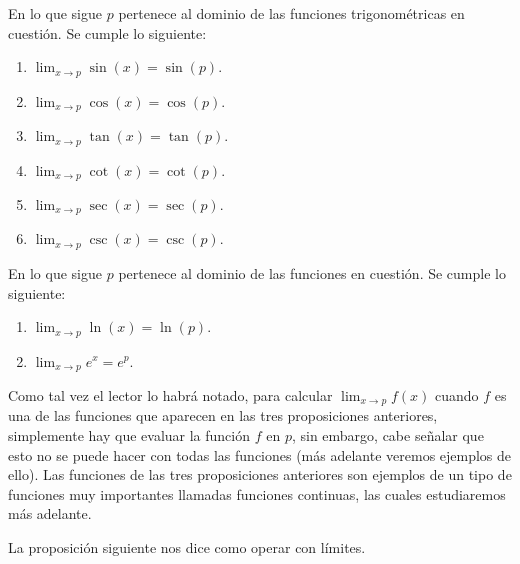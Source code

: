\documentclass[12pt,a4paper]{book}
\begin{document}
    \begin{proposicion}\label{prop:34}
        En lo
        que sigue $p$ pertenece al dominio de las funciones trigonométricas en cuestión.
        Se cumple lo siguiente:
        \begin{enumerate}[nosep]
            \item $\displaystyle\lim_{x\to p}\sin(x)=\sin(p)$.
            \item $\displaystyle\lim_{x\to p}\cos(x)=\cos(p)$.
            \item $\displaystyle\lim_{x\to p}\tan(x)=\tan(p)$.
            \item $\displaystyle\lim_{x\to p}\cot(x)=\cot(p)$.
            \item $\displaystyle\lim_{x\to p}\sec(x)=\sec(p)$.
            \item $\displaystyle\lim_{x\to p}\csc(x)=\csc(p)$.
        \end{enumerate}
    \end{proposicion}

    \begin{proposicion}\label{prop:35}
        En lo que sigue $p$ pertenece al dominio de las funciones en cuestión.
        Se cumple lo siguiente:
        \begin{enumerate}[nosep]
            \item $\displaystyle\lim_{x\to p}\ln(x)=\ln(p)$.
            \item $\displaystyle\lim_{x\to p}e^{x}=e^{p}$.
        \end{enumerate}
    \end{proposicion}

    Como tal vez el lector lo habrá notado, para calcular $\lim_{x\to p}f(x)$ cuando
    $f$ es una de las funciones que aparecen en las tres proposiciones anteriores,
    simplemente hay que evaluar la función $f$ en $p$, sin embargo, cabe señalar que
    esto no se puede hacer con todas las funciones (más adelante veremos ejemplos
    de ello). Las funciones de las tres proposiciones anteriores son ejemplos de un
    tipo de funciones muy importantes llamadas funciones continuas, las cuales
    estudiaremos más adelante.

    La proposición siguiente nos dice como operar con límites.
\end{document}
